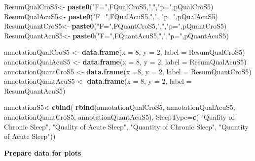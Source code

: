 \documentclass[
]{book}
\newenvironment{Shaded}{\begin{snugshade}}{\end{snugshade}}
\newcommand{\DataTypeTok}[1]{\textcolor[rgb]{0.13,0.29,0.53}{#1}}
\newcommand{\DecValTok}[1]{\textcolor[rgb]{0.00,0.00,0.81}{#1}}
\newcommand{\KeywordTok}[1]{\textcolor[rgb]{0.13,0.29,0.53}{\textbf{#1}}}
\newcommand{\NormalTok}[1]{#1}
\newcommand{\StringTok}[1]{\textcolor[rgb]{0.31,0.60,0.02}{#1}}
\begin{document}
\begin{Shaded}
\begin{Highlighting}[]
\NormalTok{ResumQualCroS5<-}\StringTok{ }\KeywordTok{paste0}\NormalTok{(}\StringTok{"F="}\NormalTok{,FQualCroS5,}\StringTok{","}\NormalTok{,}\StringTok{"p="}\NormalTok{,pQualCroS5)}
\NormalTok{ResumQualAcuS5<-}\StringTok{ }\KeywordTok{paste0}\NormalTok{(}\StringTok{"F="}\NormalTok{,FQualAcuS5,}\StringTok{","}\NormalTok{, }\StringTok{"p="}\NormalTok{,pQualAcuS5)}
\NormalTok{ResumQuantCroS5<-}\StringTok{ }\KeywordTok{paste0}\NormalTok{(}\StringTok{"F="}\NormalTok{,FQuantCroS5,}\StringTok{","}\NormalTok{,}\StringTok{"p="}\NormalTok{,pQuantCroS5)}
\NormalTok{ResumQuantAcuS5<-}\StringTok{ }\KeywordTok{paste0}\NormalTok{(}\StringTok{"F="}\NormalTok{,FQuantAcuS5,}\StringTok{","}\NormalTok{,}\StringTok{"p="}\NormalTok{,pQuantAcuS5)}

\NormalTok{annotationQualCroS5 <-}\StringTok{ }\KeywordTok{data.frame}\NormalTok{(}\DataTypeTok{x =} \DecValTok{8}\NormalTok{, }\DataTypeTok{y =} \DecValTok{2}\NormalTok{,  }\DataTypeTok{label =}\NormalTok{ ResumQualCroS5)}
\NormalTok{annotationQualAcuS5 <-}\StringTok{ }\KeywordTok{data.frame}\NormalTok{(}\DataTypeTok{x =} \DecValTok{8}\NormalTok{, }\DataTypeTok{y =} \DecValTok{2}\NormalTok{,  }\DataTypeTok{label =}\NormalTok{ ResumQualAcuS5)}
\NormalTok{annotationQuantCroS5 <-}\StringTok{ }\KeywordTok{data.frame}\NormalTok{(}\DataTypeTok{x =}\DecValTok{8}\NormalTok{, }\DataTypeTok{y =} \DecValTok{2}\NormalTok{,  }\DataTypeTok{label =}\NormalTok{ ResumQuantCroS5)}
\NormalTok{annotationQuantAcuS5 <-}\StringTok{ }\KeywordTok{data.frame}\NormalTok{(}\DataTypeTok{x =} \DecValTok{8}\NormalTok{, }\DataTypeTok{y =} \DecValTok{2}\NormalTok{,  }\DataTypeTok{label =}\NormalTok{ ResumQuantAcuS5)}

\NormalTok{annotationS5<-}\KeywordTok{cbind}\NormalTok{(}
  \KeywordTok{rbind}\NormalTok{(annotationQualCroS5, }
\NormalTok{        annotationQualAcuS5, }
\NormalTok{        annotationQuantCroS5, }
\NormalTok{        annotationQuantAcuS5),}
  \DataTypeTok{SleepType=}\KeywordTok{c}\NormalTok{(}
        \StringTok{"Quality of Chronic Sleep"}\NormalTok{, }
        \StringTok{"Quality of Acute Sleep"}\NormalTok{, }
        \StringTok{"Quantity of Chronic Sleep"}\NormalTok{, }
        \StringTok{"Quantity of Acute Sleep"}\NormalTok{))}
\end{Highlighting}
\end{Shaded}

\textbf{Prepare data for plots}
\end{document}
